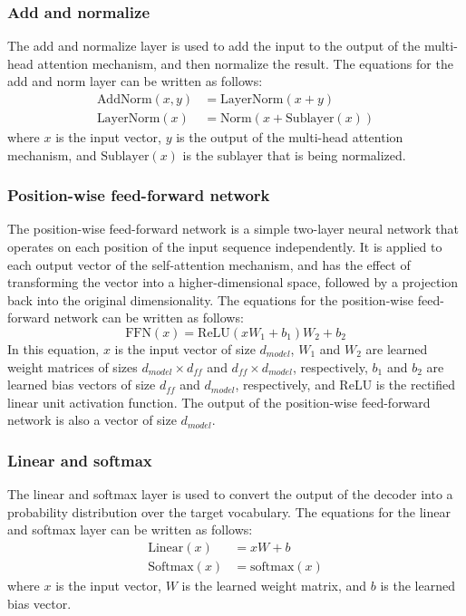 \documentclass[a4paper]{sapthesis}
\begin{document}
\subsubsection{Add and normalize}
The add and normalize layer is used to add the input to the output of the
  multi-head attention mechanism, and then normalize the result. The
    equations for the add and norm layer can be written as follows:
    \begin{align*}
      \text{AddNorm}(x,y) &= \text{LayerNorm}(x+y) \\
      \text{LayerNorm}(x) &= \text{Norm}(x+\text{Sublayer}(x))
      \end{align*}
where $x$ is the input vector, $y$ is the output of the multi-head
  attention mechanism, and $\text{Sublayer}(x)$ is the sublayer that
    is being normalized.
\subsubsection{Position-wise feed-forward network}
The position-wise feed-forward network is a simple two-layer neural 
network that operates on each position of the input sequence 
independently. It is applied to each output vector of the self-attention
 mechanism, and has the effect of transforming the vector into a 
 higher-dimensional space, followed by a projection back into the
  original dimensionality.\newline
The equations for the position-wise feed-forward network can be written
 as follows:
 \begin{equation}
   \text{FFN}(x) = \text{ReLU}(xW_1+b_1)W_2+b_2
   \end{equation}
 In this equation, $x$ is the input vector of size $d_{model}$,
  $W_1$ and $W_2$ are learned weight matrices of sizes 
  $d_{model}\times d_{ff}$ and $d_{ff}\times d_{model}$,
respectively, $b_1$ and $b_2$ are learned bias vectors of
size $d_{ff}$ and $d_{model}$, respectively, and ReLU is the
rectified linear unit activation function. The output of the
position-wise feed-forward network is also a vector of size $d_{model}$.
\subsubsection{Linear and softmax}
The linear and softmax layer is used to convert the output of the decoder
 into a probability distribution over the target vocabulary. The equations for the
   linear and softmax layer can be written as follows:
   \begin{align*}
     \text{Linear}(x) &= xW+b \\
     \text{Softmax}(x) &= \text{softmax}(x)
     \end{align*}
where $x$ is the input vector, $W$ is the learned weight matrix, and $b$
  is the learned bias vector.
\end{document}
